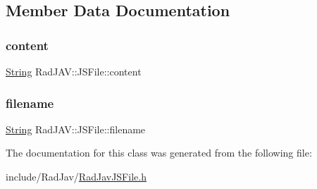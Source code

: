 \subsection{Member Data Documentation}
\mbox{\label{class_rad_j_a_v_1_1_j_s_file_adb76fa6ce7cc1d4e54af4050849cf9a1}} 
\subsubsection{\texorpdfstring{content}{content}}
{\footnotesize\ttfamily \mbox{\hyperlink{class_rad_j_a_v_1_1_string}{String}} Rad\+J\+A\+V\+::\+J\+S\+File\+::content}

\mbox{\label{class_rad_j_a_v_1_1_j_s_file_aa7c2f26ad7b8ea9966ea9e071ab437fa}} 
\subsubsection{\texorpdfstring{filename}{filename}}
{\footnotesize\ttfamily \mbox{\hyperlink{class_rad_j_a_v_1_1_string}{String}} Rad\+J\+A\+V\+::\+J\+S\+File\+::filename}



The documentation for this class was generated from the following file\+:\begin{DoxyCompactItemize}
\item 
include/\+Rad\+Jav/\mbox{\hyperlink{_rad_jav_j_s_file_8h}{Rad\+Jav\+J\+S\+File.\+h}}\end{DoxyCompactItemize}
